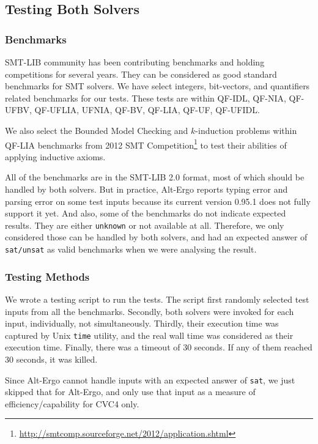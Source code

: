 \documentclass[10pt,letter]{article}
\theoremstyle{definition}
\begin{document}
\subsection{Testing Both Solvers}

\subsubsection{Benchmarks}

SMT-LIB community has been contributing benchmarks and holding competitions for several years\cite{bs2010}. They can be considered as good standard benchmarks for SMT solvers. We have select integers, bit-vectors, and quantifiers related benchmarks for our tests. These tests are within QF-IDL, QF-NIA, QF-UFBV, QF-UFLIA, UFNIA, QF-BV, QF-LIA, QF-UF, QF-UFIDL.

We also select the Bounded Model Checking and $k$-induction problems within QF-LIA benchmarks from 2012 SMT Competition\footnote{\url{http://smtcomp.sourceforge.net/2012/application.shtml}}\cite{cok20122012}
to test their abilities of applying inductive axioms.

All of the benchmarks are in the SMT-LIB 2.0 format, most of which should be handled by both solvers. But in practice, Alt-Ergo reports typing error and parsing error on some test inputs because its current version 0.95.1 does not fully support it yet. And also, some of the benchmarks do not indicate expected results. They are either {\tt unknown} or not available at all. Therefore, we only considered those can be handled by both solvers, and had an expected answer of {\tt sat/unsat} as valid benchmarks when we were analysing the result.

\subsubsection{Testing Methods}

We wrote a testing script to run the tests. The script first randomly selected test inputs from all the benchmarks. Secondly, both solvers were invoked for each input, individually, not simultaneously. Thirdly, their execution time was captured by Unix {\tt time} utility, and the real wall time was considered as their execution time. Finally, there was a timeout of 30 seconds. If any of them reached 30 seconds, it was killed. 

Since Alt-Ergo cannot handle inputs with an expected answer of {\tt sat}, we just skipped that for Alt-Ergo, and only use that input as a measure of efficiency/capability for CVC4 only.
\end{document}
